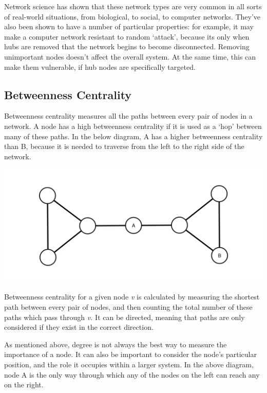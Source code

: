 \documentclass[
]{book}
\begin{document}
Network science has shown that these network types are very common in all sorts of real-world situations, from biological, to social, to computer networks. They've also been shown to have a number of particular properties: for example, it may make a computer network resistant to random `attack', because its only when hubs are removed that the network begins to become disconnected. Removing unimportant nodes doesn't affect the overall system. At the same time, this can make them vulnerable, if hub nodes are specifically targeted.

\hypertarget{betweenness-centrality}{%
\subsection{Betweenness Centrality}\label{betweenness-centrality}}

Betweenness centrality measures all the paths between every pair of nodes in a network. A node has a high betweenness centrality if it is used as a `hop' between many of these paths. In the below diagram, A has a higher betweenness centrality than B, because it is needed to traverse from the left to the right side of the network.

\includegraphics{images/betweenness.png}

Betweenness centrality for a given node \emph{v} is calculated by measuring the shortest path between every pair of nodes, and then counting the total number of these paths which pass through \emph{v.} It can be directed, meaning that paths are only considered if they exist in the correct direction.

As mentioned above, degree is not always the best way to measure the importance of a node. It can also be important to consider the node's particular position, and the role it occupies within a larger system. In the above diagram, node A is the only way through which any of the nodes on the left can reach any on the right.
\end{document}
